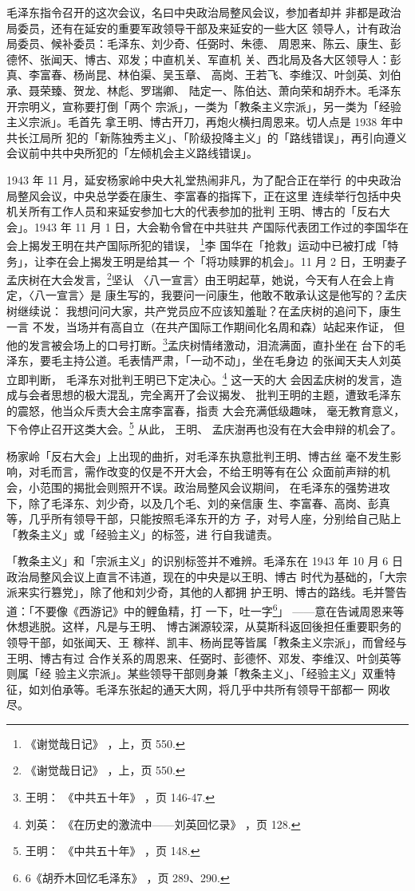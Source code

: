 毛泽东指令召开的这次会议，名曰中央政治局整风会议，参加者却并
非都是政治局委员，还有在延安的重要军政领导干部及来延安的一些大区
领导人，计有政治局委员、候补委员：毛泽东、刘少奇、任弼时、朱德、
周恩来、陈云、康生、彭德怀、张闻天、博古、邓发；中直机关、军直机
关、西北局及各大区领导人：彭真、李富春、杨尚昆、林伯渠、吴玉章、
高岗、王若飞、李维汉、叶剑英、刘伯承、聂荣臻、贺龙、林彪、罗瑞卿、
陆定一、陈伯达、萧向荣和胡乔木。毛泽东开宗明义，宣称要打倒「两个
宗派」，一类为「教条主义宗派」，另一类为「经验主义宗派」。毛首先
拿王明、博古开刀，再炮火横扫周恩来。切人点是 1938 年中共长江局所
犯的「新陈独秀主义」、「阶级投降主义」的「路线错误」，再引向遵义
会议前中共中央所犯的「左倾机会主义路线错误」。

1943 年 11 月，延安杨家岭中央大礼堂热闹非凡，为了配合正在举行
的中央政治局整风会议，中央总学委在康生、李富春的指挥下，正在这里
连续举行包括中央机关所有工作人员和来延安参加七大的代表参加的批判
王明、博古的「反右大会」。1943 年 11 月 1 日，大会勒令曾在中共驻共
产国际代表团工作过的李国华在会上揭发王明在共产国际所犯的错误，
\footnote{《谢觉哉日记》
，上，页 550.}李
国华在「抢救」运动中已被打成「特务」，让李在会上揭发王明是给其一
个「将功赎罪的机会」。11 月 2 日，王明妻子孟庆树在大会发言，\footnote{《谢觉哉日记》
，上，页 550.}坚认
〈八一宣言〉由王明起草，她说，今天有人在会上肯定，〈八一宣言〉是
康生写的，我要问一问康生，他敢不敢承认这是他写的？孟庆树继续说：
我想问问大家，共产党员应不应该知羞耻？在孟庆树的追问下，康生一言
不发，当场并有高自立（在共产国际工作期间化名周和森）站起来作证，
但他的发言被会场上的口号打断。\footnote{王明：
《中共五十年》
，页 146-47.}孟庆树情绪激动，泪流满面，直扑坐在
台下的毛泽东，要毛主持公道。毛表情严肃，「一动不动」，坐在毛身边
的张闻天夫人刘英立即判断，
毛泽东对批判王明已下定决心。\footnote{刘英：
《在历史的激流中——刘英回忆录》
，页 128.} 这一天的大
会因孟庆树的发言，造成与会者思想的极大混乱，完全离开了会议揭发、
批判王明的主题，遭致毛泽东的震怒，他当众斥责大会主席李富春，指责
大会充满低级趣味，
毫无教育意义，
下令停止召开这类大会。\footnote{王明：
《中共五十年》
，页 148.} 从此，
王明、
孟庆澍再也没有在大会申辩的机会了。

杨家岭「反右大会」上出现的曲折，对毛泽东执意批判王明、博古丝
毫不发生影响，对毛而言，需作改变的仅是不开大会，不给王明等有在公
众面前声辩的机会，小范围的揭批会则照开不误。政治局整风会议期间，
在毛泽东的强势进攻下，除了毛泽东、刘少奇，以及几个毛、刘的亲信康
生、李富春、高岗、彭真等，几乎所有领导干部，只能按照毛泽东开的方
子，对号人座，分别给自己贴上「教条主义」或「经验主义」的标签，进
行自我谴责。

「教条主义」和「宗派主义」的识别标签并不难辨。毛泽东在 1943
年 10 月 6 日政治局整风会议上直言不讳道，现在的中央是以王明、博古
时代为基础的，「大宗派来实行篡党」，除了他和刘少奇，其他的人都拥
护王明、博古的路线。毛并警告道：「不要像《西游记》中的鲤鱼精，打
一下，吐一字\footnote{6《胡乔木回忆毛泽东》
，页 289、290.}」
——意在告诫周恩来等休想逃脱。这样，凡是与王明、
博古渊源较深，从莫斯科返回後担任重要职务的领导干部，如张闻天、王
稼祥、凯丰、杨尚昆等皆属「教条主义宗派」，而曾经与王明、博古有过
合作关系的周恩来、任弼时、彭德怀、邓发、李维汉、叶剑英等则属「经
验主义宗派」。某些领导干部则身兼「教条主义」、「经验主义」双重特
征，如刘伯承等。毛泽东张起的通天大网，将几乎中共所有领导干部都一
网收尽。

